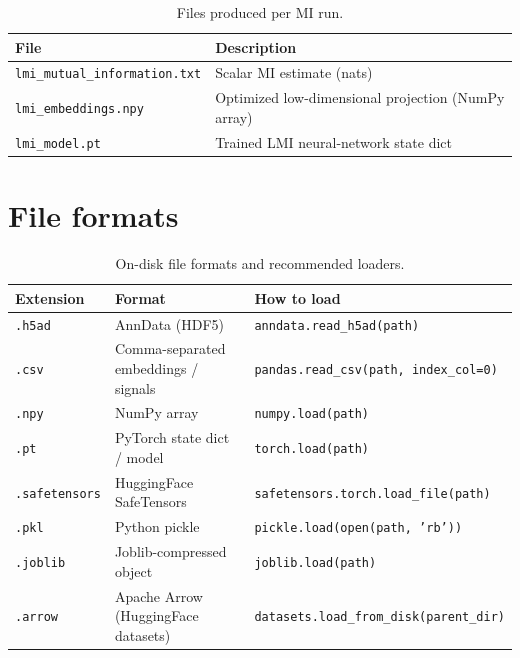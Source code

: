 \documentclass{article}
\begin{document}
\begin{table}[!htbp]
\centering
\caption{Files produced per MI run.}
\label{tab:mi_files}
\small
\begin{tabular}{ll}
\toprule
\textbf{File} & \textbf{Description} \\
\midrule
\texttt{lmi\_mutual\_information.txt} & Scalar MI estimate (nats) \\
\texttt{lmi\_embeddings.npy}          & Optimized low-dimensional projection (NumPy array) \\
\texttt{lmi\_model.pt}                & Trained LMI neural-network state dict \\
\bottomrule
\end{tabular}
\end{table}

\section{File formats}

\begin{table}[!htbp]
\centering
\caption{On-disk file formats and recommended loaders.}
\label{tab:formats}
\small
\begin{tabular}{lll}
\toprule
\textbf{Extension} & \textbf{Format} & \textbf{How to load} \\
\midrule
\texttt{.h5ad}        & AnnData (HDF5)                        & \texttt{anndata.read\_h5ad(path)} \\
\texttt{.csv}         & Comma-separated embeddings / signals  & \texttt{pandas.read\_csv(path, index\_col=0)} \\
\texttt{.npy}         & NumPy array                           & \texttt{numpy.load(path)} \\
\texttt{.pt}          & PyTorch state dict / model            & \texttt{torch.load(path)} \\
\texttt{.safetensors} & HuggingFace SafeTensors               & \texttt{safetensors.torch.load\_file(path)} \\
\texttt{.pkl}         & Python pickle                         & \texttt{pickle.load(open(path, 'rb'))} \\
\texttt{.joblib}      & Joblib-compressed object              & \texttt{joblib.load(path)} \\
\texttt{.arrow}       & Apache Arrow (HuggingFace datasets)   & \texttt{datasets.load\_from\_disk(parent\_dir)} \\
\bottomrule
\end{tabular}
\end{table}
\end{document}
